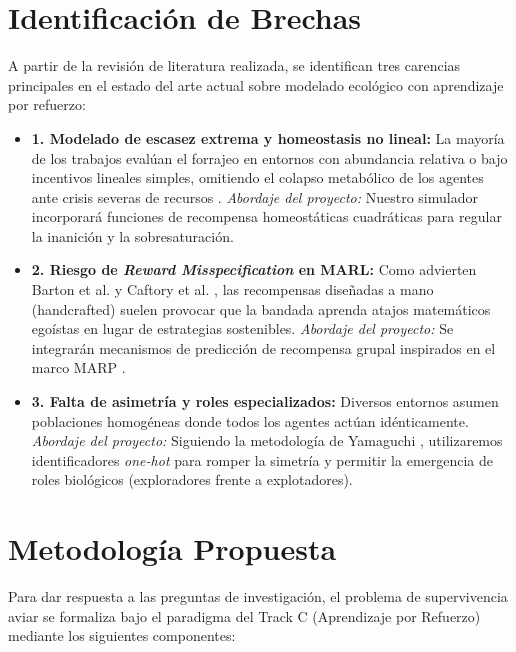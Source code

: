 \documentclass[conference]{IEEEtran}
\begin{document}
\section{Identificación de Brechas}
A partir de la revisión de literatura realizada, se identifican tres carencias principales en el estado del arte actual sobre modelado ecológico con aprendizaje por refuerzo:

\begin{itemize}
    \item \textbf{1. Modelado de escasez extrema y homeostasis no lineal:} La mayoría de los trabajos eval\'uan el forrajeo en entornos con abundancia relativa o bajo incentivos lineales simples, omitiendo el colapso metabólico de los agentes ante crisis severas de recursos \cite{Paper2, Paper14}. \textit{Abordaje del proyecto:} Nuestro simulador incorporará funciones de recompensa homeostáticas cuadráticas para regular la inanición y la sobresaturación.
    \item \textbf{2. Riesgo de \textit{Reward Misspecification} en MARL:} Como advierten Barton et al. \cite{Paper15} y Caftory et al. \cite{Paper11}, las recompensas diseñadas a mano (handcrafted) suelen provocar que la bandada aprenda atajos matemáticos egoístas en lugar de estrategias sostenibles. \textit{Abordaje del proyecto:} Se integrarán mecanismos de predicción de recompensa grupal inspirados en el marco MARP \cite{Paper11}.
    \item \textbf{3. Falta de asimetría y roles especializados:} Diversos entornos asumen poblaciones homogéneas donde todos los agentes act\'uan idénticamente. \textit{Abordaje del proyecto:} Siguiendo la metodología de Yamaguchi \cite{Paper12}, utilizaremos identificadores \textit{one-hot} para romper la simetría y permitir la emergencia de roles biológicos (exploradores frente a explotadores).
\end{itemize}

\section{Metodología Propuesta}

Para dar respuesta a las preguntas de investigación, el problema de 
supervivencia aviar se formaliza bajo el paradigma del Track C (Aprendizaje por 
Refuerzo) mediante los siguientes componentes:
\end{document}
